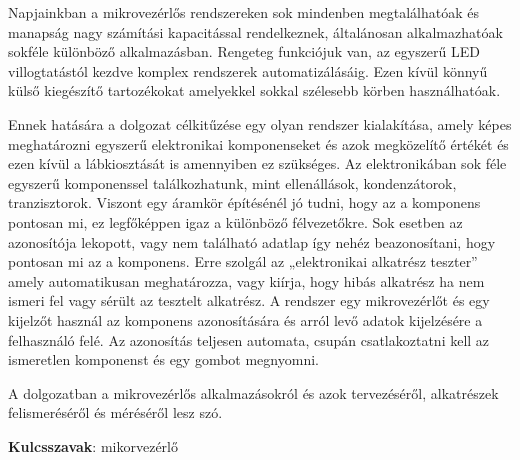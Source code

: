 Napjainkban a mikrovezérlős rendszereken sok mindenben megtalálhatóak és manapság nagy számítási kapacitással rendelkeznek, általánosan alkalmazhatóak sokféle különböző alkalmazásban. Rengeteg funkciójuk van, az egyszerű LED villogtatástól kezdve komplex rendszerek automatizálásáig. Ezen kívül könnyű külső kiegészítő tartozékokat amelyekkel sokkal szélesebb körben használhatóak.

Ennek hatására a dolgozat célkitűzése egy olyan rendszer kialakítása, amely képes meghatározni egyszerű elektronikai komponenseket és azok megközelítő értékét és ezen kívül a lábkiosztását is amennyiben ez szükséges. Az elektronikában sok féle egyszerű komponenssel találkozhatunk, mint ellenállások, kondenzátorok, tranzisztorok. Viszont egy áramkör építésénél jó tudni, hogy az a komponens pontosan mi, ez legfőképpen igaz a különböző félvezetőkre. Sok esetben az azonosítója lekopott, vagy nem található adatlap így nehéz beazonosítani, hogy pontosan mi az a komponens. Erre szolgál az „elektronikai alkatrész teszter” amely automatikusan meghatározza, vagy kiírja, hogy hibás alkatrész ha nem ismeri fel vagy sérült az tesztelt alkatrész. A rendszer egy mikrovezérlőt és egy kijelzőt használ az komponens azonosítására és arról levő adatok kijelzésére a felhasználó felé. Az azonosítás teljesen automata, csupán csatlakoztatni kell az ismeretlen komponenst és egy gombot megnyomni.

A dolgozatban a mikrovezérlős alkalmazásokról és azok tervezéséről, alkatrészek felismeréséről és méréséről lesz szó.

\textbf{Kulcsszavak}: mikorvezérlő